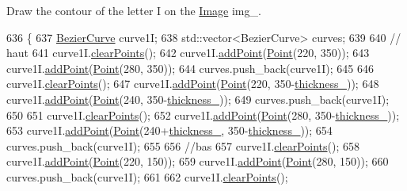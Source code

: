 Draw the contour of the letter I on the \mbox{\hyperlink{class_image}{Image}} img\+\_\+. 


\begin{DoxyCode}
636               \{
637     \mbox{\hyperlink{class_bezier_curve}{BezierCurve}} curve1I;
638     std::vector<BezierCurve> curves;
639 
640     \textcolor{comment}{// haut}
641     curve1I.\mbox{\hyperlink{class_bezier_curve_a0ba8ce66d5af5971ae6a1b506029728e}{clearPoints}}();
642     curve1I.\mbox{\hyperlink{class_bezier_curve_a38d16c18b36ae45619b05e26e226cf34}{addPoint}}(\mbox{\hyperlink{class_point}{Point}}(220, 350));
643     curve1I.\mbox{\hyperlink{class_bezier_curve_a38d16c18b36ae45619b05e26e226cf34}{addPoint}}(\mbox{\hyperlink{class_point}{Point}}(280, 350));
644     curves.push\_back(curve1I);
645 
646     curve1I.\mbox{\hyperlink{class_bezier_curve_a0ba8ce66d5af5971ae6a1b506029728e}{clearPoints}}();
647     curve1I.\mbox{\hyperlink{class_bezier_curve_a38d16c18b36ae45619b05e26e226cf34}{addPoint}}(\mbox{\hyperlink{class_point}{Point}}(220, 350-\mbox{\hyperlink{class_font_v1_aed8040e76be9a52833627b92f0fb4e5f}{thickness\_}}));
648     curve1I.\mbox{\hyperlink{class_bezier_curve_a38d16c18b36ae45619b05e26e226cf34}{addPoint}}(\mbox{\hyperlink{class_point}{Point}}(240, 350-\mbox{\hyperlink{class_font_v1_aed8040e76be9a52833627b92f0fb4e5f}{thickness\_}}));
649     curves.push\_back(curve1I);
650 
651     curve1I.\mbox{\hyperlink{class_bezier_curve_a0ba8ce66d5af5971ae6a1b506029728e}{clearPoints}}();
652     curve1I.\mbox{\hyperlink{class_bezier_curve_a38d16c18b36ae45619b05e26e226cf34}{addPoint}}(\mbox{\hyperlink{class_point}{Point}}(280, 350-\mbox{\hyperlink{class_font_v1_aed8040e76be9a52833627b92f0fb4e5f}{thickness\_}}));
653     curve1I.\mbox{\hyperlink{class_bezier_curve_a38d16c18b36ae45619b05e26e226cf34}{addPoint}}(\mbox{\hyperlink{class_point}{Point}}(240+\mbox{\hyperlink{class_font_v1_aed8040e76be9a52833627b92f0fb4e5f}{thickness\_}}, 350-\mbox{\hyperlink{class_font_v1_aed8040e76be9a52833627b92f0fb4e5f}{thickness\_}}));
654     curves.push\_back(curve1I);
655 
656     \textcolor{comment}{//bas}
657     curve1I.\mbox{\hyperlink{class_bezier_curve_a0ba8ce66d5af5971ae6a1b506029728e}{clearPoints}}();
658     curve1I.\mbox{\hyperlink{class_bezier_curve_a38d16c18b36ae45619b05e26e226cf34}{addPoint}}(\mbox{\hyperlink{class_point}{Point}}(220, 150));
659     curve1I.\mbox{\hyperlink{class_bezier_curve_a38d16c18b36ae45619b05e26e226cf34}{addPoint}}(\mbox{\hyperlink{class_point}{Point}}(280, 150));
660     curves.push\_back(curve1I);
661 
662     curve1I.\mbox{\hyperlink{class_bezier_curve_a0ba8ce66d5af5971ae6a1b506029728e}{clearPoints}}();

\end{DoxyCode}
